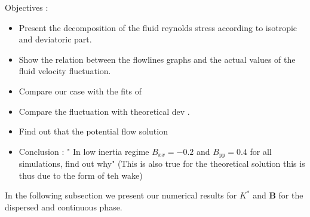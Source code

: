 








Objectives : 
\begin{itemize}
    \item Present the decomposition of the fluid reynolds stress according to isotropic and deviatoric part.
    \item Show the relation between the flowlines graphs and the actual values of the fluid velocity fluctuation.
    \item Compare our case with the fits of  \citet{almeras2019fluctuations} 
    \item Compare the fluctuation with theoretical dev \citet{lance1991turbulence,zhang1994ensemble}. 
    \item Find out that the potential flow solution 
    \item Conclusion : " In low inertia regime $B_{xx} = - 0.2$ and $B_{yy} = 0.4$ for all simulations, find out why" (This is also true for the theoretical solution\citep{lance1991turbulence} this is thus due to the form of teh wake)
\end{itemize}






In the following subsection we present our numerical results for $K^*$ and $\textbf{B}$ for the dispersed and continuous phase. 




